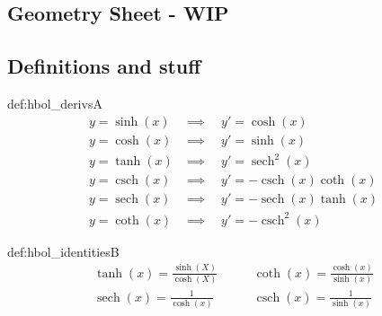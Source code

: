 \documentclass[landscape, 8pt]{extarticle}
\DeclareMathOperator{\sech}{sech}
\DeclareMathOperator{\csch}{csch}
\begin{document}
\setlength{\abovedisplayskip}{3.5pt}
\setlength{\belowdisplayskip}{3.5pt}
\setlength{\abovedisplayshortskip}{3.5pt}
\setlength{\belowdisplayshortskip}{3.5pt}

\begin{multicols}{3}
\raggedcolumns %
\section{\huge Geometry Sheet - WIP}
\vspace{-5pt}

\subsection*{Definitions and stuff}

\begin{dfn}{def:hbol_derivs}{A}
    \begin{align*}
        y = \sinh(x) & \implies \quad y' = \cosh(x) \\
        y = \cosh(x) & \implies \quad y' = \sinh(x) \\
        y = \tanh(x) & \implies \quad y' = \sech^{2}(x) \\
        y = \csch(x) & \implies \quad y' = -\csch(x)\coth(x) \\
        y = \sech(x) & \implies \quad y' = -\sech(x)\tanh(x) \\
        y = \coth(x) & \implies \quad y' = -\csch^{2}(x)
    \end{align*}
\end{dfn}
\vspace{-5pt}

\begin{dfn}{def:hbol_identities}{B}
    \begin{align*}
        \tanh(x) = \frac{\sinh(X)}{\cosh(X)} & \qquad \coth(x) = \frac{\cosh(x)}{\sinh(x)} \\
        \sech(x) = \frac{1}{\cosh(x)} & \qquad \csch(x) = \frac{1}{\sinh(x)}
    \end{align*}
\end{dfn}
\vspace{-5pt}


\end{multicols}
\end{document}
